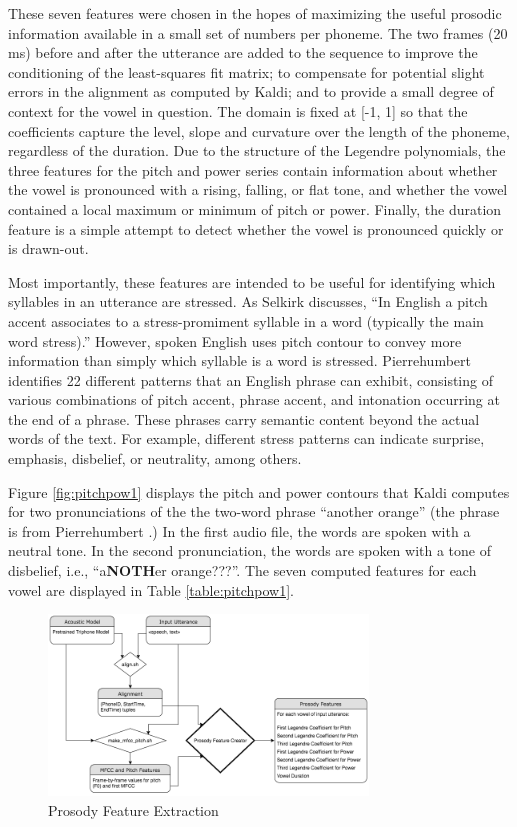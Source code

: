 \documentclass{article}
\begin{document}
These seven features were chosen in the hopes of maximizing the useful prosodic information available in a small set of numbers per phoneme.
The two frames (20 ms) before and after the utterance are added to the sequence to improve the conditioning of the least-squares fit matrix; to compensate for potential slight errors in the alignment as computed by Kaldi; and to provide a small degree of context for the vowel in question.
The domain is fixed at [-1, 1] so that the coefficients capture the level, slope and curvature over the length of the phoneme, regardless of the duration.
Due to the structure of the Legendre polynomials, the three features for the pitch and power series contain information about whether the vowel is pronounced with a rising, falling, or flat tone, and whether the vowel contained a local maximum or minimum of pitch or power.
Finally, the duration feature is a simple attempt to detect whether the vowel is pronounced quickly or is drawn-out.

Most importantly, these features are intended to be useful for identifying which syllables in an utterance are stressed. As Selkirk \cite{selkirk1995sentence} discusses, ``In English a pitch accent associates to a stress-promiment syllable in a word (typically the main word stress).''
However, spoken English uses pitch contour to convey more information than simply which syllable is a word is stressed. Pierrehumbert \cite{pierrehumbert1980phonology} identifies 22 different patterns that an English phrase can exhibit, consisting of various combinations of pitch accent, phrase accent, and intonation occurring at the end of a phrase.
These phrases carry semantic content beyond the actual words of the text. For example, different stress patterns can indicate surprise, emphasis, disbelief, or neutrality, among others.

Figure \ref{fig:pitchpow1} displays the pitch and power contours that Kaldi computes for two pronunciations of the the two-word phrase ``another orange'' (the phrase is from Pierrehumbert \cite{pierrehumbert1980phonology}.) In the first audio file, the words are spoken with a neutral tone. In the second pronunciation, the words are spoken with a tone of disbelief, i.e., ``a\textbf{NOTH}er orange???''. The seven computed features for each vowel are displayed in Table \ref{table:pitchpow1}.

\begin{figure}[htb]

\begin{minipage}[b]{1.0\linewidth}
  \centering
  \centerline{\includegraphics[width=8.5cm]{Prosody_Extraction.png}}
\end{minipage}
\caption{Prosody Feature Extraction}
\label{fig:prosodyextraction}
\end{figure}
\end{document}
